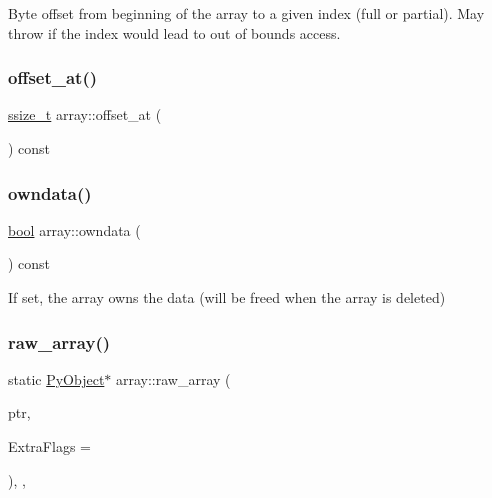 Byte offset from beginning of the array to a given index (full or partial). May throw if the index would lead to out of bounds access. \mbox{\label{classarray_ada98138e241b891a543478dbe6494f17}} 
\subsubsection{\texorpdfstring{offset\_at()}{offset\_at()}\hspace{0.1cm}{\footnotesize\ttfamily [2/2]}}
{\footnotesize\ttfamily \mbox{\hyperlink{detail_2common_8h_ac430d16fc097b3bf0a7469cfd09decda}{ssize\+\_\+t}} array\+::offset\+\_\+at (\begin{DoxyParamCaption}{ }\end{DoxyParamCaption}) const\hspace{0.3cm}{\ttfamily [inline]}}

\mbox{\label{classarray_aa1ad8575ad6a6b900027c360a44e7ef0}} 
\subsubsection{\texorpdfstring{owndata()}{owndata()}}
{\footnotesize\ttfamily \mbox{\hyperlink{asdl_8h_af6a258d8f3ee5206d682d799316314b1}{bool}} array\+::owndata (\begin{DoxyParamCaption}{ }\end{DoxyParamCaption}) const\hspace{0.3cm}{\ttfamily [inline]}}



If set, the array owns the data (will be freed when the array is deleted) 

\mbox{\label{classarray_a1b059af39c8d296d72f31dcb4952cd4a}} 
\subsubsection{\texorpdfstring{raw\_array()}{raw\_array()}}
{\footnotesize\ttfamily static \mbox{\hyperlink{_python27_2object_8h_aadc84ac7aed2cfa6f20c25f62bf3dac7}{Py\+Object}}$\ast$ array\+::raw\+\_\+array (\begin{DoxyParamCaption}\item[{\mbox{\hyperlink{_python27_2object_8h_aadc84ac7aed2cfa6f20c25f62bf3dac7}{Py\+Object}} $\ast$}]{ptr,  }\item[{\mbox{\hyperlink{warnings_8h_a74f207b5aa4ba51c3a2ad59b219a423b}{int}}}]{Extra\+Flags = {} }\end{DoxyParamCaption})\hspace{0.3cm}{\ttfamily [inline]}, {\ttfamily [static]}, {\ttfamily [protected]}}



